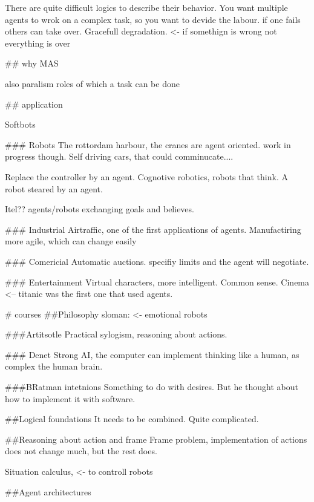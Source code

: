There are quite difficult logics to describe their behavior.
You want multiple agents to wrok on a complex task, so you want to devide
the labour. if one fails others can take over.
Gracefull degradation. <- if somethign is wrong not everything is over

## why MAS

also paralism
roles of which a task can be done

## application

Softbots

### Robots
The rottordam harbour, the cranes are agent oriented. work in progress though.
Self driving cars, that could comminucate....

Replace the controller by an agent. Cognotive robotics, robots that think.
A robot steared by an agent.

Itel?? agents/robots exchanging goals and believes.

### Industrial
Airtraffic, one of the first applications of agents.
Manufactiring more agile, which can change easily

### Comericial
Automatic auctions. specifiy limits and the agent will negotiate.

### Entertainment
Virtual characters, more intelligent. Common sense.
Cinema <-- titanic was the first one that used agents.

# courses
##Philosophy
sloman: <- emotional robots


###Artitsotle
Practical sylogism, reasoning about actions.

### Denet
Strong AI, the computer can implement thinking like a human, as complex the
human brain.

###BRatman intetnions
Something to do with desires. But he thought about how to implement it with
software.

##Logical foundations
It needs to be combined. Quite complicated.

##Reasoning about action and frame
Frame problem, implementation of actions does not change much, but the rest does.

Situation calculus, <- to controll robots

##Agent architectures
